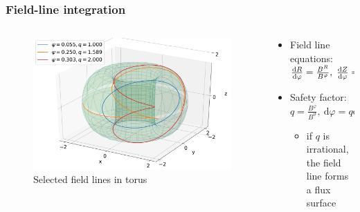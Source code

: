 \documentclass{beamer}
\begin{document}
\begin{frame}
\frametitle{Field-line integration}
\vspace{-0.5 cm}
\begin{columns}[onlytextwidth]
	\begin{column}{0.5\textwidth}
		\begin{center}
			\begin{figure}
				\includegraphics[trim={0 0cm 0 0cm},clip,width=1\textwidth]{FIGURES/field_lines_torus.pdf}
				\caption{Selected field lines in torus}
			\end{figure}
		\end{center}
	\end{column}
	\begin{column}{0.5\textwidth}
		\vspace{0 cm}
		\begin{center}
			\begin{itemize}
				\item Field line equations: $\frac{\textrm{d}R}{\textrm{d}\varphi} = \frac{B^R}{B^\varphi}, \hspace{0.1cm} \frac{\textrm{d}Z}{\textrm{d}\varphi} = \frac{B^Z}{B^\varphi}
				$
				\vspace{1cm}
				\item Safety factor: \newline $q = \frac{B^\varphi}{B^\vartheta},~\textrm{d}\varphi= q\textrm{d}\vartheta
				$
					\begin{itemize}
					\item if $q$ is irrational, the field line forms a flux surface
				\end{itemize}
			\end{itemize}
		\end{center}
	\end{column}
\end{columns}
\end{frame}
\end{document}
